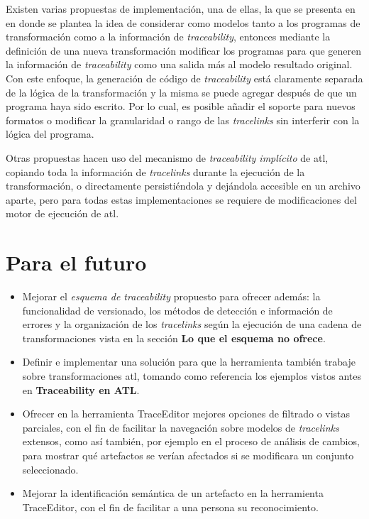 \documentclass[a4paper,12pt,twoside,spanish,openright]{book}
\begin{document}
Existen varias propuestas de implementación, una de ellas, la que se presenta en \cite{Jouault} en donde se plantea la idea de considerar como modelos tanto a los programas de transformación como a la información de \textit{traceability}, entonces mediante la definición de una nueva transformación modificar los programas para que generen la información de \textit{traceability} como una salida más al modelo resultado original. Con este enfoque, la generación de código de \textit{traceability} está claramente separada de la lógica de la transformación y la misma se puede agregar después de que un programa haya sido escrito. Por lo cual, es posible añadir el soporte para nuevos formatos o modificar la granularidad o rango de las \textit{tracelinks} sin interferir con la lógica del programa.

Otras propuestas hacen uso del mecanismo de \textit{traceability implícito} de \gls{atl}, copiando toda la información de \textit{tracelinks} durante la ejecución de la transformación, o directamente persistiéndola y dejándola accesible en un archivo aparte, pero para todas estas implementaciones se requiere de modificaciones del motor de ejecución de \gls{atl}.


\section*{Para el futuro}

\begin{itemize}

\item Mejorar el \textit{esquema de traceability} propuesto para ofrecer además: la funcionalidad de versionado, los métodos de detección e información de errores y la organización de los \textit{tracelinks} según la ejecución de una cadena de transformaciones vista en la sección \textbf{Lo que el esquema no ofrece}.

\item Definir e implementar una solución para que la herramienta también trabaje sobre transformaciones \gls{atl}, tomando como referencia los ejemplos vistos antes en \textbf{Traceability en ATL}.

\item Ofrecer en la herramienta \textsf{TraceEditor} mejores opciones de filtrado o vistas parciales, con el fin de facilitar la navegación sobre modelos de \textit{tracelinks} extensos, como así también, por ejemplo en el proceso de análisis de cambios, para mostrar qué artefactos se verían afectados si se modificara un conjunto seleccionado.

\item Mejorar la identificación semántica de un artefacto en la herramienta \textsf{TraceEditor}, con el fin de facilitar a una persona su reconocimiento.

\end{itemize}
\end{document}

